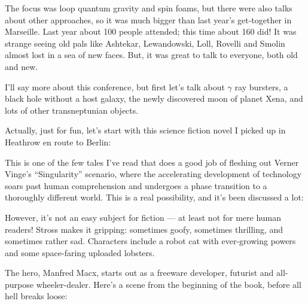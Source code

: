 \documentclass{article}
\def\tightlist{}
\renewcommand{\texttt}[1]{%
  \begingroup
  \ttfamily
  \begingroup\lccode`~=`/\lowercase{\endgroup\def~}{/\discretionary{}{}{}}%
  \begingroup\lccode`~=`[\lowercase{\endgroup\def~}{[\discretionary{}{}{}}%
  \begingroup\lccode`~=`.\lowercase{\endgroup\def~}{.\discretionary{}{}{}}%
  \catcode`/=\active\catcode`[=\active\catcode`.=\active
  \scantokens{#1\noexpand}%
  \endgroup
}
\begin{document}
The focus was loop quantum gravity and spin foams, but there were also
talks about other approaches, so it was much bigger than last year's
get-together in Marseille. Last year about 100 people attended; this
time about 160 did! It was strange seeing old pals like Ashtekar,
Lewandowski, Loll, Rovelli and Smolin almost lost in a sea of new faces.
But, it was great to talk to everyone, both old and new.

I'll say more about this conference, but first let's talk about
\(\gamma\) ray bursters, a black hole without a host galaxy, the newly
discovered moon of planet Xena, and lots of other transneptunian
objects.

Actually, just for fun, let's start with this science fiction novel I
picked up in Heathrow en route to Berlin:


This is one of the few tales I've read that does a good job of fleshing
out Verner Vinge's ``Singularity'' scenario, where the accelerating
development of technology soars past human comprehension and undergoes a
phase transition to a thoroughly different world. This is a real
possibility, and it's been discussed a lot:


However, it's not an easy subject for fiction --- at least not for mere
human readers! Stross makes it gripping: sometimes goofy, sometimes
thrilling, and sometimes rather sad. Characters include a robot cat with
ever-growing powers and some space-faring uploaded lobsters.

The hero, Manfred Macx, starts out as a freeware developer, futurist and
all-purpose wheeler-dealer. Here's a scene from the beginning of the
book, before all hell breaks loose:
\end{document}
